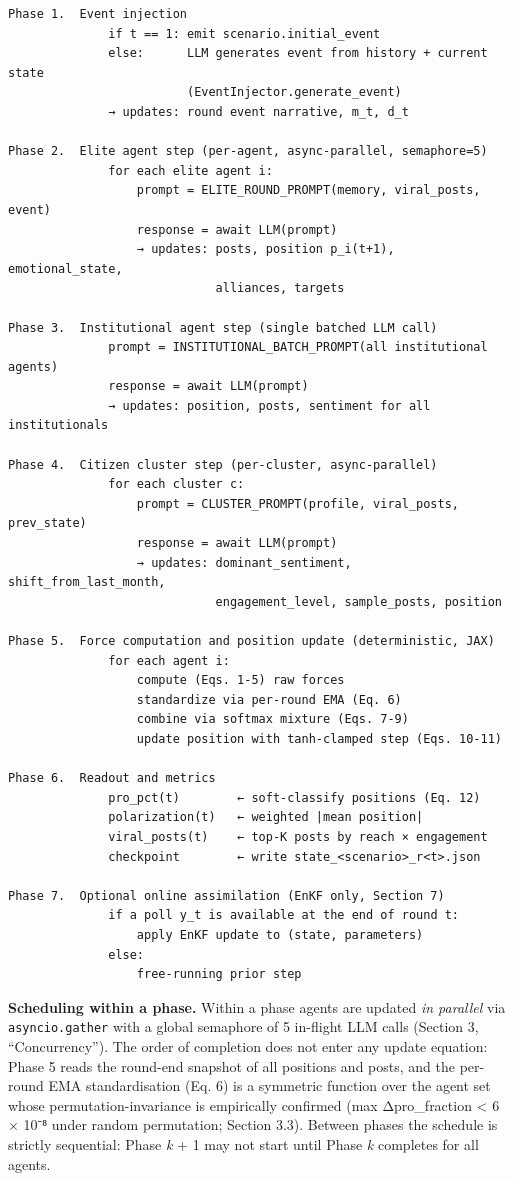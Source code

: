 \documentclass[
]{article}
\begin{document}
\begin{verbatim}
Phase 1.  Event injection
              if t == 1: emit scenario.initial_event
              else:      LLM generates event from history + current state
                         (EventInjector.generate_event)
              → updates: round event narrative, m_t, d_t

Phase 2.  Elite agent step (per-agent, async-parallel, semaphore=5)
              for each elite agent i:
                  prompt = ELITE_ROUND_PROMPT(memory, viral_posts, event)
                  response = await LLM(prompt)
                  → updates: posts, position p_i(t+1), emotional_state,
                             alliances, targets

Phase 3.  Institutional agent step (single batched LLM call)
              prompt = INSTITUTIONAL_BATCH_PROMPT(all institutional agents)
              response = await LLM(prompt)
              → updates: position, posts, sentiment for all institutionals

Phase 4.  Citizen cluster step (per-cluster, async-parallel)
              for each cluster c:
                  prompt = CLUSTER_PROMPT(profile, viral_posts, prev_state)
                  response = await LLM(prompt)
                  → updates: dominant_sentiment, shift_from_last_month,
                             engagement_level, sample_posts, position

Phase 5.  Force computation and position update (deterministic, JAX)
              for each agent i:
                  compute (Eqs. 1-5) raw forces
                  standardize via per-round EMA (Eq. 6)
                  combine via softmax mixture (Eqs. 7-9)
                  update position with tanh-clamped step (Eqs. 10-11)

Phase 6.  Readout and metrics
              pro_pct(t)        ← soft-classify positions (Eq. 12)
              polarization(t)   ← weighted |mean position|
              viral_posts(t)    ← top-K posts by reach × engagement
              checkpoint        ← write state_<scenario>_r<t>.json

Phase 7.  Optional online assimilation (EnKF only, Section 7)
              if a poll y_t is available at the end of round t:
                  apply EnKF update to (state, parameters)
              else:
                  free-running prior step
\end{verbatim}

\textbf{Scheduling within a phase.} Within a phase agents are updated
\emph{in parallel} via \texttt{asyncio.gather} with a global semaphore
of 5 in-flight LLM calls (Section 3, ``Concurrency''). The order of
completion does not enter any update equation: Phase 5 reads the
round-end snapshot of all positions and posts, and the per-round EMA
standardisation (Eq. 6) is a symmetric function over the agent set whose
permutation-invariance is empirically confirmed (max
\textbar Δpro\_fraction\textbar{} \textless{} 6 × 10⁻⁸ under random
permutation; Section 3.3). Between phases the schedule is strictly
sequential: Phase \emph{k} + 1 may not start until Phase \emph{k}
completes for all agents.
\end{document}

